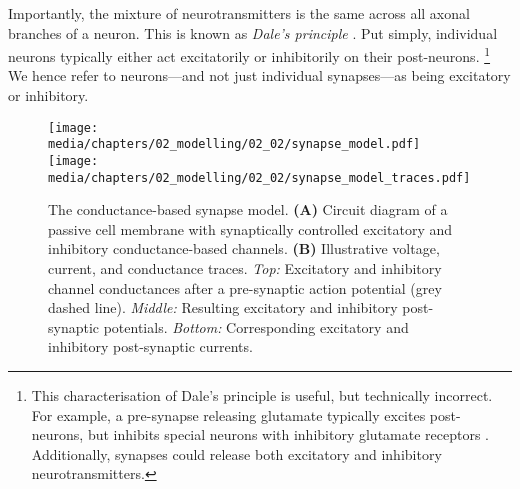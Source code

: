 Importantly, the mixture of neurotransmitters is the same across all axonal branches of a neuron.
This is known as \emph{Dale's principle} \citep{strata1999dale,eccles1986chapter}.
Put simply, individual neurons typically either act excitatorily or inhibitorily on their post-neurons.%
\footnote{This characterisation of Dale's principle is useful, but technically incorrect. For example, a pre-synapse releasing glutamate typically excites post-neurons, but inhibits special neurons with inhibitory glutamate receptors \citep{cleland1996inhibitory}.
Additionally, synapses could release both excitatory and inhibitory neurotransmitters.
}
We hence refer to neurons---and not just individual synapses---as being excitatory or inhibitory.

\begin{figure}
	\centering
	\texttt{[image: media/chapters/02\_modelling/02\_02/synapse\_model.pdf]}%
	\texttt{[image: media/chapters/02\_modelling/02\_02/synapse\_model\_traces.pdf]}%
	{\label{fig:synapse_model_circuit}}%
	{\label{fig:synapse_model_traces}}%
	\caption[The conductance-based synapse model]{The conductance-based synapse model.
	\textbf{(A)} Circuit diagram of a passive cell membrane with synaptically controlled excitatory and inhibitory conductance-based channels.
	\textbf{(B)} Illustrative voltage, current, and conductance traces. \emph{Top:} Excitatory and inhibitory channel conductances after a pre-synaptic action potential (grey dashed line). \emph{Middle:} Resulting excitatory and inhibitory post-synaptic potentials. \emph{Bottom:} Corresponding excitatory and inhibitory post-synaptic currents.}
	\label{fig:synapse_model}
\end{figure}

